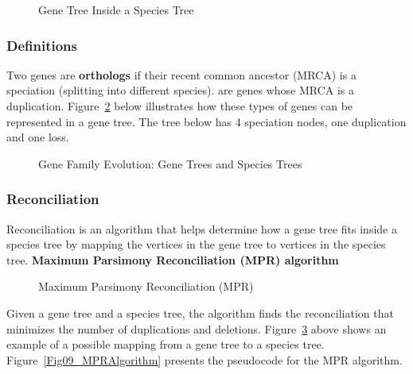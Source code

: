 \begin{figure}[ht!]
  \centering
  \caption{Gene Tree Inside a Species Tree}
  \label{GeneSpecies}
\end{figure}

\subsubsection{Definitions}
Two genes are {\bf orthologs} if their recent common ancestor (MRCA) is a speciation (splitting into different species).
 are genes whose MRCA is a duplication.
\newline Figure~\ref{Fig07_GeneFamilyEvolution} below illustrates how these types of genes can be represented in a gene tree. The tree below has 4 speciation nodes, one duplication and one loss.
 
\begin{figure}[H]
  \centering
  \caption{Gene Family Evolution: Gene Trees and Species Trees}
  \label{Fig07_GeneFamilyEvolution}
\end{figure}

\subsubsection{Reconciliation}

\noindent Reconciliation is an algorithm that helps determine how a gene tree fits inside a species tree by mapping the vertices in the gene tree to vertices in the species tree. 
\newline
\newline
{\bf Maximum Parsimony Reconciliation (MPR) algorithm}

\begin{figure}[H]
  \centering
  \caption{Maximum Parsimony Reconciliation (MPR) } 
  \label{Fig08_MaximumParsimonyReconciliation}
\end{figure}

\noindent Given a gene tree and a species tree, the algorithm finds the reconciliation that minimizes the number of duplications and deletions. Figure~\ref{Fig08_MaximumParsimonyReconciliation} above shows an example of a possible mapping from a gene tree to a species tree. Figure~\ref{Fig09_MPRAlgorithm} presents the pseudocode for the MPR algorithm.


